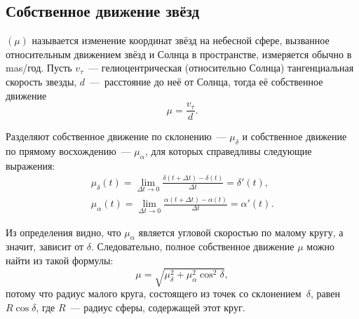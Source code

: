 \subsection{Собственное движение звёзд}
 $(\mu)$ называется изменение координат звёзд на небесной сфере, вызванное относительным движением звёзд и Солнца в пространстве, измеряется обычно в mas/год. Пусть $v_\tau$~--- гелиоцентрическая (относительно Солнца) тангенциальная скорость звезды, $d$~---~расстояние до неё от Солнца, тогда её собственное движение
\begin{equation}
    \mu = \frac{v_\tau}{d}.
\end{equation}

Разделяют собственное движение по склонению~--- $\mu_\delta$ и собственное движение по прямому восхождению~--- $\mu_\alpha$, для которых справедливы следующие выражения:
\begin{gather}
    \mu_\delta(t) = \lim_{\Delta t \rightarrow 0} \frac{\delta(t + \Delta t) - \delta(t)}{\Delta t} = \delta'(t),\\
    \mu_\alpha(t) = \lim_{\Delta t \rightarrow 0} \frac{\alpha(t + \Delta t) - \alpha(t)}{\Delta t} = \alpha'(t).
\end{gather}

Из определения видно, что $\mu_\alpha$ является угловой скоростью по малому кругу, а значит, зависит от $\delta$. Следовательно, полное собственное движение $\mu$ можно найти из такой формулы:
\begin{equation}
    \mu = \sqrt{\mu_\delta^2 + \mu_\alpha^2 \cos^2 \delta},
\end{equation}
потому что радиус малого круга, состоящего из точек со склонением~$\delta$, равен $R \cos \delta$, где $R$~--- радиус сферы, содержащей этот круг.


